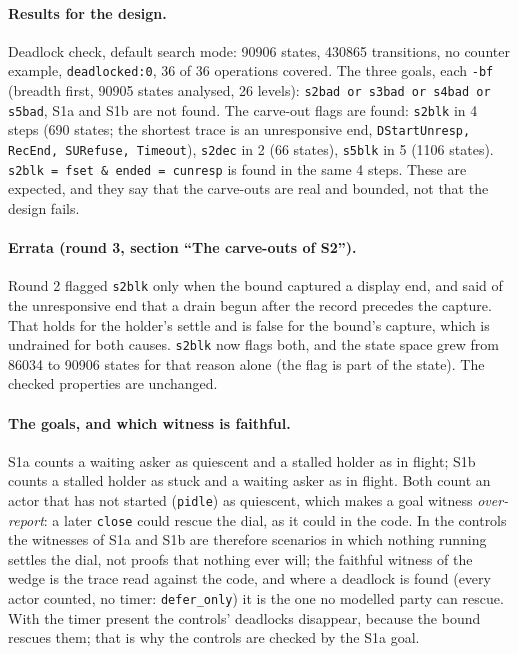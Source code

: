 \documentclass[a4paper,10pt,fleqn]{article}
\begin{document}
\paragraph{Results for the design.}
Deadlock check, default search mode: 90906 states, 430865 transitions, no
counter example, \texttt{deadlocked:0}, 36 of 36 operations covered.  The three
goals, each \texttt{-bf} (breadth first, 90905 states analysed, 26 levels):
\texttt{s2bad or s3bad or s4bad or s5bad}, S1a and S1b are not found.  The
carve-out flags are found: \texttt{s2blk} in 4 steps (690 states; the shortest
trace is an unresponsive end, \texttt{DStartUnresp, RecEnd, SURefuse,
Timeout}), \texttt{s2dec} in 2 (66 states), \texttt{s5blk} in 5 (1106 states).
\texttt{s2blk = fset \& ended = cunresp} is found in the same 4 steps.  These
are expected, and they say that the carve-outs are real and bounded, not that
the design fails.

\paragraph{Errata (round 3, section ``The carve-outs of S2'').}
Round 2 flagged \texttt{s2blk} only when the bound captured a display end, and
said of the unresponsive end that a drain begun after the record precedes the
capture.  That holds for the holder's settle and is false for the bound's
capture, which is undrained for both causes.  \texttt{s2blk} now flags both, and
the state space grew from 86034 to 90906 states for that reason alone (the flag
is part of the state).  The checked properties are unchanged.

\paragraph{The goals, and which witness is faithful.}
S1a counts a waiting asker as quiescent and a stalled holder as in flight; S1b
counts a stalled holder as stuck and a waiting asker as in flight.  Both count an
actor that has not started (\texttt{pidle}) as quiescent, which makes a goal
witness \emph{over-report}: a later \texttt{close} could rescue the dial, as it
could in the code.  In the controls the witnesses of S1a and S1b are therefore
scenarios in which nothing running settles the dial, not proofs that nothing
ever will; the faithful witness of the wedge is the trace read against the code,
and where a deadlock is found (every actor counted, no timer: \texttt{defer\_only})
it is the one no modelled party can rescue.  With the timer present the
controls' deadlocks disappear, because the bound rescues them; that is why the
controls are checked by the S1a goal.
\end{document}
